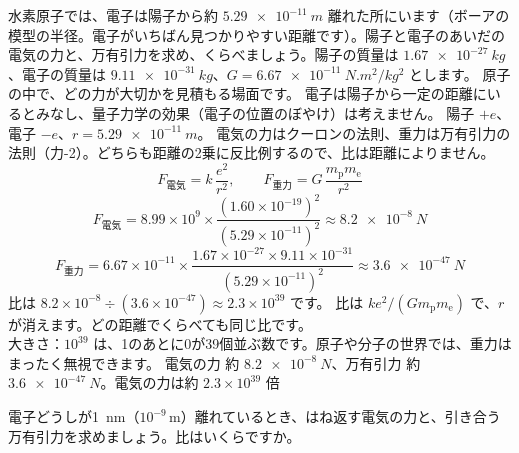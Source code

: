 \label{ph:電-1:ex2}
\begin{phreidai}
水素原子では、電子は陽子から約 $\qty{5.29e-11}{m}$ 離れた所にいます（ボーアの模型の半径。電子がいちばん見つかりやすい距離です）。陽子と電子のあいだの電気の力と、万有引力を求め、くらべましょう。陽子の質量は $\qty{1.67e-27}{kg}$、電子の質量は $\qty{9.11e-31}{kg}$、$G=\qty{6.67e-11}{N.m^2/kg^2}$ とします。
\phbamen
原子の中で、どの力が大切かを見積もる場面です。
\phmushi
電子は陽子から一定の距離にいるとみなし、量子力学の効果（電子の位置のぼやけ）は考えません。
\phzu
陽子 $+e$、電子 $-e$、$r=\qty{5.29e-11}{m}$。
\phriyu
電気の力はクーロンの法則、重力は万有引力の法則（力-2）。どちらも距離の2乗に反比例するので、比は距離によりません。
\phtateru
\[F_{\text{電気}}=k\,\frac{e^2}{r^2},\qquad F_{\text{重力}}=G\,\frac{m_{\mathrm p}m_{\mathrm e}}{r^2}\]
\phtoku
\[F_{\text{電気}}=8.99\times10^9\times\frac{(1.60\times10^{-19})^2}{(5.29\times10^{-11})^2}\approx\qty{8.2e-8}{N}\]
\[F_{\text{重力}}=6.67\times10^{-11}\times\frac{1.67\times10^{-27}\times9.11\times10^{-31}}{(5.29\times10^{-11})^2}\approx\qty{3.6e-47}{N}\]
比は $8.2\times10^{-8}\div(3.6\times10^{-47})\approx2.3\times10^{39}$ です。
\phtashikame
比は $ke^2/(Gm_{\mathrm p}m_{\mathrm e})$ で、$r$ が消えます。どの距離でくらべても同じ比です。\\
大きさ：$10^{39}$ は、1のあとに0が39個並ぶ数です。原子や分子の世界では、重力はまったく無視できます。
\kotae 電気の力 約 $\qty{8.2e-8}{N}$、万有引力 約 $\qty{3.6e-47}{N}$。電気の力は約 $2.3\times10^{39}$ 倍
\end{phreidai}
\begin{jibun}
電子どうしが\qty{1}{nm}（$10^{-9}$\,m）離れているとき、はね返す電気の力と、引き合う万有引力を求めましょう。比はいくらですか。
\end{jibun}

